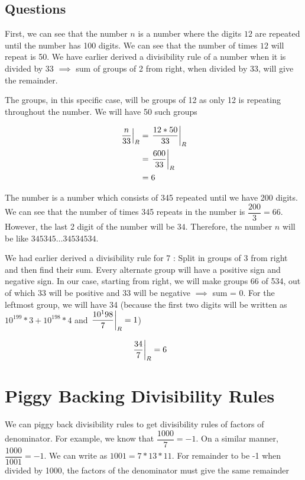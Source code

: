 \subsection{Questions}

First, we can see that the number $n$ is a number where the digits $12$ are repeated until the number has 100 digits. We can see that the number of times $12$ will repeat is 50. We have earlier derived a divisibility rule of a number when it is divided by 33 $\implies$ sum of groups of 2 from right, when divided by 33, will give the remainder. 

The groups, in this specific case, will be groups of 12 as only 12 is repeating throughout the number. We will have 50 such groups

\begin{align*}
    \displaystyle{ \left. \frac{n}{33} \right |_{R} } &= \displaystyle{ \left. \frac{12 * 50}{33} \right |_{R} } \\
    &= \displaystyle{ \left. \frac{600}{33} \right |_{R} } \\
    &= 6
\end{align*}


The number is a number which consists of 345 repeated until we have 200 digits. We can see that the number of times 345 repeats in the number is $\dfrac{200}{3} = 66$. However, the last 2 digit of the number will be $34$. Therefore, the number $n$ will be like $345345\ldots34534534$. 

We had earlier derived a divisibility rule for 7 : Split in groups of 3 from right and then find their sum. Every alternate group will have a positive sign and negative sign. In our case, starting from right, we will make groups 66 of 534, out of which 33 will be positive and 33 will be negative $\implies$ sum = 0. For the leftmost group, we will have 34 (because the first two digits will be written as $10^{199} * 3 + 10^{198} * 4$ and $\displaystyle{ \left. \frac{10^198}{7} \right |_{R} } = 1$)

\begin{align*}
    \displaystyle{ \left. \frac{34}{7} \right |_{R} } &= 6
\end{align*}

\section{Piggy Backing Divisibility Rules}

We can piggy back divisibility rules to get divisibility rules of factors of denominator. For example, we know that $\dfrac{1000}{7} = -1$. On a similar manner, $\dfrac{1000}{1001} = -1$. We can write as $1001 = 7 * 13 * 11$. For remainder to be -1 when divided by 1000, the factors of the denominator must give the same remainder

